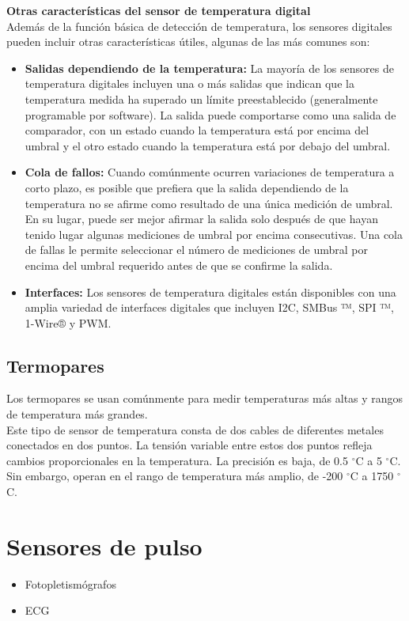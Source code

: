     \textbf{Otras características del sensor de temperatura digital}\\
    Además de la función básica de detección de temperatura, los sensores digitales pueden incluir otras características útiles, algunas de las más comunes son:
    \begin{itemize}
    	\item \textbf{Salidas dependiendo de la temperatura:} La mayoría de los sensores de temperatura digitales incluyen una o más salidas que indican que la temperatura medida ha superado un límite preestablecido (generalmente programable por software). La salida puede comportarse como una salida de comparador, con un estado cuando la temperatura está por encima del umbral y el otro estado cuando la temperatura está por debajo del umbral.
    	
    	\item \textbf{Cola de fallos:} Cuando comúnmente ocurren variaciones de temperatura a corto plazo, es posible que prefiera que la salida dependiendo de la temperatura no se afirme como resultado de una única medición de umbral. En su lugar, puede ser mejor afirmar la salida solo después de que hayan tenido lugar algunas mediciones de umbral por encima consecutivas. Una cola de fallas le permite seleccionar el número de mediciones de umbral por encima del umbral requerido antes de que se confirme la salida.
    	
    	\item \textbf{Interfaces:} Los sensores de temperatura digitales están disponibles con una amplia variedad de interfaces digitales que incluyen I2C, SMBus ™, SPI ™, 1-Wire® y PWM.
    \end{itemize}
	
			
	\subsection{Termopares}
	Los termopares se usan comúnmente para medir temperaturas más altas y rangos de temperatura más grandes.\\
			
	Este tipo de sensor de temperatura consta de dos cables de diferentes metales conectados en dos puntos. La tensión variable entre estos dos puntos refleja cambios proporcionales en la temperatura. La precisión es baja, de 0.5 $^{\circ}$C a 5 $^{\circ}$C. Sin embargo, operan en el rango de temperatura más amplio, de -200 $^{\circ}$C a 1750 $^{\circ}$C.			
	
	
	\section{Sensores de pulso}
		\begin{itemize}
			\item Fotopletismógrafos
			\item ECG
		\end{itemize}
	
